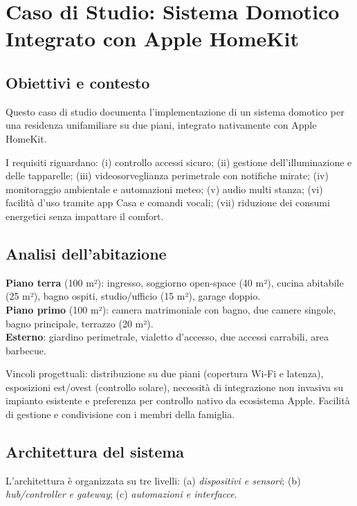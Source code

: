 \chapter{Caso di Studio: Sistema Domotico Integrato con Apple HomeKit}

\section{Obiettivi e contesto}
Questo caso di studio documenta l’implementazione di un sistema domotico per una residenza unifamiliare su due piani, integrato nativamente con Apple HomeKit. 

I requisiti riguardano: (i) controllo accessi sicuro; (ii) gestione dell’illuminazione e delle tapparelle; (iii) videosorveglianza perimetrale con notifiche mirate; (iv) monitoraggio ambientale e automazioni meteo; (v) audio multi stanza; (vi) facilità d’uso tramite app Casa e comandi vocali; (vii) riduzione dei consumi energetici senza impattare il comfort.

\section{Analisi dell’abitazione}
\textbf{Piano terra} (100 m²): ingresso, soggiorno open-space (40 m²), cucina abitabile (25 m²), bagno ospiti, studio/ufficio (15 m²), garage doppio.\\
\textbf{Piano primo} (100 m²): camera matrimoniale con bagno, due camere singole, bagno principale, terrazzo (20 m²).\\
\textbf{Esterno}: giardino perimetrale, vialetto d’accesso, due accessi carrabili, area barbecue.

Vincoli progettuali: distribuzione su due piani (copertura Wi‑Fi e latenza), esposizioni est/ovest (controllo solare), necessità di integrazione non invasiva su impianto esistente e preferenza per controllo nativo da ecosistema Apple. Facilità di gestione e condivisione con i membri della famiglia.

\section{Architettura del sistema}
L’architettura è organizzata su tre livelli: (a) \textit{dispositivi e sensori}; (b) \textit{hub/controller e gateway}; (c) \textit{automazioni e interfacce}.

